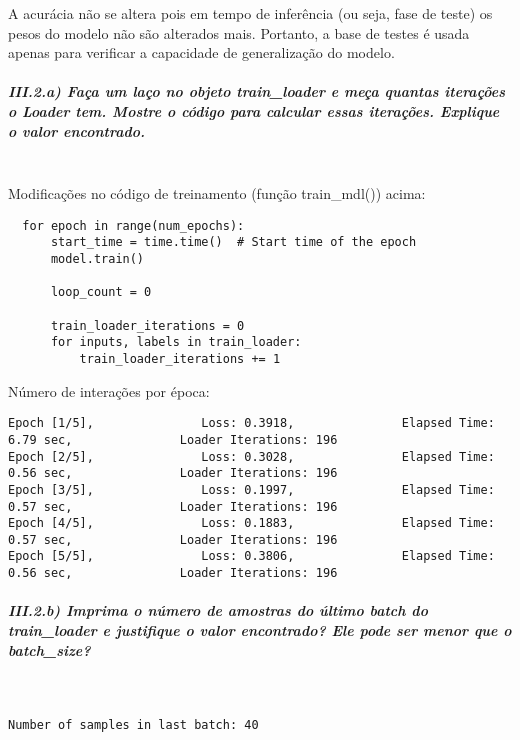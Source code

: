 \documentclass[11pt]{article}
\begin{document}
A acurácia não se altera pois em tempo de inferência (ou seja, fase de
teste) os pesos do modelo não são alterados mais. Portanto, a base de
testes é usada apenas para verificar a capacidade de generalização do
modelo.

    \subparagraph{III.2.a) Faça um laço no objeto train\_loader e meça
quantas iterações o Loader tem. Mostre o código para calcular essas
iterações. Explique o valor
encontrado.}\label{iii.2.a-fauxe7a-um-lauxe7o-no-objeto-train_loader-e-meuxe7a-quantas-iterauxe7uxf5es-o-loader-tem.-mostre-o-cuxf3digo-para-calcular-essas-iterauxe7uxf5es.-explique-o-valor-encontrado.}\mbox{} \\

Modificações no código de treinamento (função train\_mdl()) acima:

\begin{verbatim}
  for epoch in range(num_epochs):
      start_time = time.time()  # Start time of the epoch
      model.train()

      loop_count = 0

      train_loader_iterations = 0    
      for inputs, labels in train_loader:
          train_loader_iterations += 1
\end{verbatim}

Número de interações por época:

\begin{verbatim}
Epoch [1/5],               Loss: 0.3918,               Elapsed Time: 6.79 sec,               Loader Iterations: 196
Epoch [2/5],               Loss: 0.3028,               Elapsed Time: 0.56 sec,               Loader Iterations: 196
Epoch [3/5],               Loss: 0.1997,               Elapsed Time: 0.57 sec,               Loader Iterations: 196
Epoch [4/5],               Loss: 0.1883,               Elapsed Time: 0.57 sec,               Loader Iterations: 196
Epoch [5/5],               Loss: 0.3806,               Elapsed Time: 0.56 sec,               Loader Iterations: 196
\end{verbatim}

\subparagraph{III.2.b) Imprima o número de amostras do último batch do
train\_loader e justifique o valor encontrado? Ele pode ser menor que o
batch\_size?}\label{iii.2.b-imprima-o-nuxfamero-de-amostras-do-uxfaltimo-batch-do-train_loader-e-justifique-o-valor-encontrado-ele-pode-ser-menor-que-o-batch_size}\mbox{} \\

\begin{verbatim}
Number of samples in last batch: 40
\end{verbatim}
\end{document}
